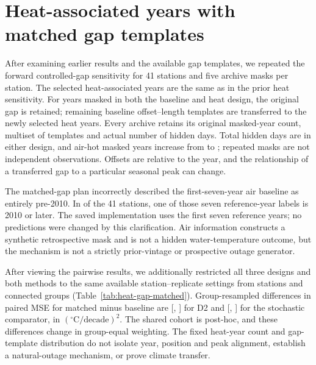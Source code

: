 \section{Heat-associated years with matched gap templates}
After examining earlier results and the available gap templates, we repeated the forward controlled-gap sensitivity for 41 stations and five archive masks per station. The selected heat-associated years are the same as in the prior heat sensitivity. For years masked in both the baseline and heat design, the original gap is retained; remaining baseline offset--length templates are transferred to the newly selected heat years. Every archive retains its original masked-year count, multiset of templates and actual number of hidden days. Total hidden days are \HGDays{} in either design, and air-hot masked years increase from \HGHotBase{} to \HGHotNew{}; repeated masks are not independent observations. Offsets are relative to the year, and the relationship of a transferred gap to a particular seasonal peak can change.

The matched-gap plan incorrectly described the first-seven-year air baseline as entirely pre-2010. In \HGBurninStations{} of the 41 stations, one of those seven reference-year labels is 2010 or later. The saved implementation uses the first seven reference years; no predictions were changed by this clarification. Air information constructs a synthetic retrospective mask and is not a hidden water-temperature outcome, but the mechanism is not a strictly prior-vintage or prospective outage generator.

After viewing the pairwise results, we additionally restricted all three designs and both methods to the same \HGArchives{} available station--replicate settings from \HGStations{} stations and \HGGroups{} connected groups (Table~\ref{tab:heat-gap-matched}). Group-resampled differences in paired MSE for matched minus baseline are [\HGDLow, \HGDHigh] for D2 and [\HGSLow, \HGSHigh] for the stochastic comparator, in $({}^{\circ}\mathrm{C}/\mathrm{decade})^2$. The shared cohort is post-hoc, and these differences change in group-equal weighting. The fixed heat-year count and gap-template distribution do not isolate year, position and peak alignment, establish a natural-outage mechanism, or prove climate transfer.

\begin{table}[ht]\caption{Three-way common cohort, baseline / previous heat / matched heat, with independent annual ranks. RMSE, widths and interval scores are $^{\circ}$C per decade; coverage is for nominal 95\% trend intervals.}\label{tab:heat-gap-matched}\centering\small
{}\end{table}

